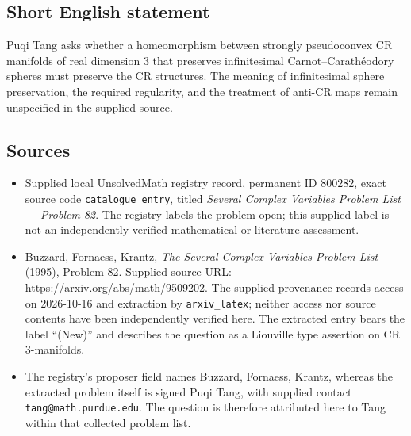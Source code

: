 \documentclass[11pt]{article}
\begin{document}
\subsection{Short English statement}
Puqi Tang asks whether a homeomorphism between strongly pseudoconvex CR manifolds of real dimension \(3\) that preserves infinitesimal Carnot--Carath\'eodory spheres must preserve the CR structures. The meaning of infinitesimal sphere preservation, the required regularity, and the treatment of anti-CR maps remain unspecified in the supplied source.
\subsection{Sources}
\begin{itemize}
\item Supplied local UnsolvedMath registry record, permanent ID \(800282\), exact source code \texttt{catalogue entry}, titled \emph{Several Complex Variables Problem List --- Problem 82}. The registry labels the problem open; this supplied label is not an independently verified mathematical or literature assessment.
\item Buzzard, Fornaess, Krantz, \emph{The Several Complex Variables Problem List} (1995), Problem 82. Supplied source URL: \url{https://arxiv.org/abs/math/9509202}. The supplied provenance records access on 2026-10-16 and extraction by \texttt{arxiv\_latex}; neither access nor source contents have been independently verified here. The extracted entry bears the label ``(New)'' and describes the question as a Liouville type assertion on CR \(3\)-manifolds.
\item The registry's proposer field names Buzzard, Fornaess, Krantz, whereas the extracted problem itself is signed Puqi Tang, with supplied contact \texttt{tang@math.purdue.edu}. The question is therefore attributed here to Tang within that collected problem list.
\end{itemize}
\end{document}
